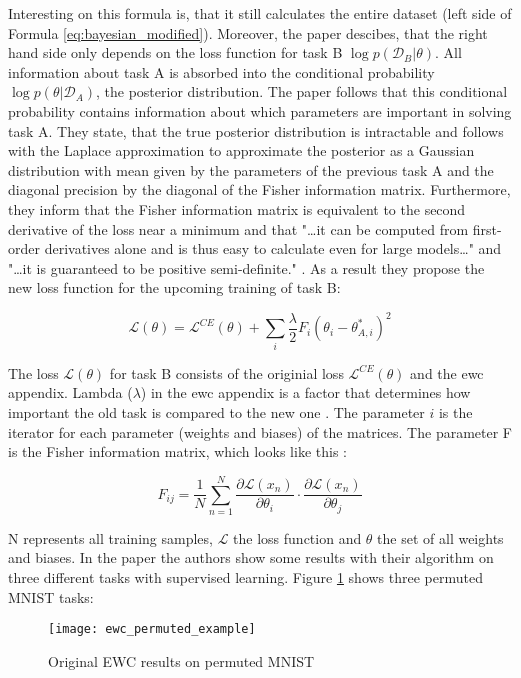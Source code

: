 Interesting on this formula is, that it still calculates the entire dataset (left side of Formula \eqref{eq:bayesian_modified}). Moreover, the paper descibes, that the right hand side only depends on the loss function for task B $\log p(\mathcal{D}_B | \theta)$. All information about task A is absorbed into the conditional probability $\log p(\theta | \mathcal{D}_A)$, the posterior distribution.
The paper follows that this conditional probability contains information about which parameters are important in solving task A.
\cite{elastic-weight-consolidation, schaeffer_ewc}
\newline
They state, that the true posterior distribution is intractable and follows with the Laplace approximation to approximate the posterior as a Gaussian distribution with mean given by the parameters of the previous task A and the diagonal precision by the diagonal of the Fisher information matrix.
\cite{elastic-weight-consolidation}
\newline
Furthermore, they inform that the Fisher information matrix is equivalent to the second derivative of the loss near a minimum and that "…it can be computed from first-order derivatives alone and is thus easy to calculate even for large models…" \cite{elastic-weight-consolidation} and "…it is guaranteed to be positive semi-definite."
\cite{elastic-weight-consolidation}.
\cite{elastic-weight-consolidation, schaeffer_ewc}
\newline
As a result they propose the new loss function for the upcoming training of task B:

\begin{equation}
    \mathcal{L}(\theta) = \mathcal{L}^{CE}(\theta) + \sum_{i} \frac{\lambda}{2} F_{i} (\theta_{i} - \theta_{A,i}^{*})^2
\end{equation}

The loss $\mathcal{L}(\theta)$ for task B consists of the originial loss $\mathcal{L}^{CE}(\theta)$ and the \acrshort{ewc} appendix.
Lambda ($\lambda$) in the \acrshort{ewc} appendix is a factor that determines how important the old task is compared to the new one \cite{elastic-weight-consolidation}.
The parameter $i$ is the iterator for each parameter (weights and biases) of the matrices.
The parameter F is the Fisher information matrix, which looks like this \cite{incremental-moment-matching}:

\begin{equation}
    F_{ij} = \frac{1}{N} \sum_{n=1}^{N} \frac{\partial \mathcal{L} \left( x_n \right) }{\partial \theta_{i}} \cdot \frac{\partial \mathcal{L} \left( x_n \right) }{\partial \theta_{j}}
\end{equation}

N represents all training samples, $\mathcal{L}$ the loss function and $\theta$ the set of all weights and biases.
In the paper the authors show some results with their algorithm on three different tasks with supervised learning. Figure \ref{fig:ewc_permuted_example} shows three permuted MNIST tasks:
\begin{figure}[H]
    \centering
    \texttt{[image: ewc\_permuted\_example]}
    \caption{\cite{elastic-weight-consolidation} Original EWC results on permuted MNIST}
    \label{fig:ewc_permuted_example}
\end{figure}